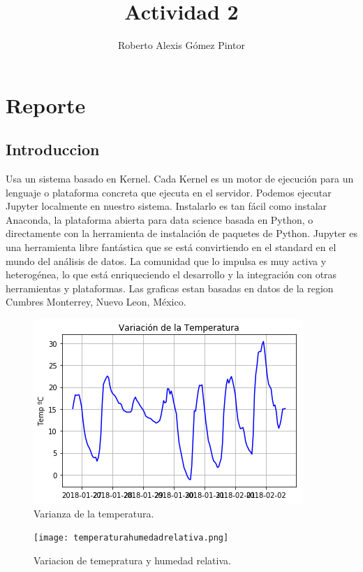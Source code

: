 \documentclass{article}
\title{Actividad 2}
\author{Roberto Alexis Gómez Pintor}
\begin{document}
\maketitle
\section{Reporte}
\subsection{Introduccion}
Usa un sistema basado en Kernel. Cada Kernel es un motor de ejecución para un lenguaje o plataforma concreta que ejecuta en el servidor. Podemos ejecutar Jupyter localmente en nuestro sistema. Instalarlo es tan fácil como instalar Anaconda, la plataforma abierta para data science basada en Python, o directamente con la herramienta de instalación de paquetes de Python. Jupyter es una herramienta libre fantástica que se está convirtiendo en el standard en el mundo del análisis de datos. La comunidad que lo impulsa es muy activa y heterogénea, lo que está enriqueciendo el desarrollo y la integración con otras herramientas y plataformas. Las graficas estan basadas en datos de la region Cumbres Monterrey, Nuevo Leon, México.
\begin{figure}
  \includegraphics[width=\linewidth]{temperatura.png}
  \caption{Varianza de la temperatura.}
  \label{fig:boat1}
\end{figure}

\begin{figure}
  \texttt{[image: temperaturahumedadrelativa.png]}
  \caption{Variacion de temepratura y humedad relativa.}
  \label{fig:boat1}
\end{figure}
\end{document}
